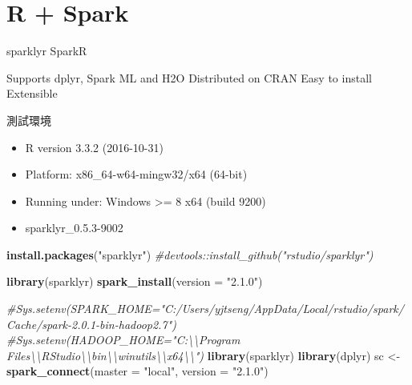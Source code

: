 \documentclass[]{book}
\newenvironment{Shaded}{\begin{snugshade}}{\end{snugshade}}
\newcommand{\KeywordTok}[1]{\textcolor[rgb]{0.13,0.29,0.53}{\textbf{{#1}}}}
\newcommand{\DataTypeTok}[1]{\textcolor[rgb]{0.13,0.29,0.53}{{#1}}}
\newcommand{\StringTok}[1]{\textcolor[rgb]{0.31,0.60,0.02}{{#1}}}
\newcommand{\CommentTok}[1]{\textcolor[rgb]{0.56,0.35,0.01}{\textit{{#1}}}}
\newcommand{\NormalTok}[1]{{#1}}
\providecommand{\tightlist}{%
  \setlength{\itemsep}{0pt}\setlength{\parskip}{0pt}}
\theoremstyle{definition}
\theoremstyle{definition}
\theoremstyle{remark}
\begin{document}
\section{R + Spark}\label{r-spark}

sparklyr SparkR

Supports dplyr, Spark ML and H2O Distributed on CRAN Easy to install
Extensible

測試環境

\begin{itemize}
\tightlist
\item
  R version 3.3.2 (2016-10-31)
\item
  Platform: x86\_64-w64-mingw32/x64 (64-bit)
\item
  Running under: Windows \textgreater{}= 8 x64 (build 9200)
\item
  sparklyr\_0.5.3-9002
\end{itemize}

\begin{Shaded}
\begin{Highlighting}[]
\KeywordTok{install.packages}\NormalTok{(}\StringTok{"sparklyr"}\NormalTok{)}
\CommentTok{#devtools::install_github("rstudio/sparklyr")}
\end{Highlighting}
\end{Shaded}

\begin{Shaded}
\begin{Highlighting}[]
\KeywordTok{library}\NormalTok{(sparklyr)}
\KeywordTok{spark_install}\NormalTok{(}\DataTypeTok{version =} \StringTok{"2.1.0"}\NormalTok{)}
\end{Highlighting}
\end{Shaded}

\begin{Shaded}
\begin{Highlighting}[]
\CommentTok{#Sys.setenv(SPARK_HOME="C:/Users/yjtseng/AppData/Local/rstudio/spark/Cache/spark-2.0.1-bin-hadoop2.7")}
\CommentTok{#Sys.setenv(HADOOP_HOME="C:\textbackslash{}\textbackslash{}Program Files\textbackslash{}\textbackslash{}RStudio\textbackslash{}\textbackslash{}bin\textbackslash{}\textbackslash{}winutils\textbackslash{}\textbackslash{}x64\textbackslash{}\textbackslash{}")}
\KeywordTok{library}\NormalTok{(sparklyr)}
\KeywordTok{library}\NormalTok{(dplyr)}
\NormalTok{sc <-}\StringTok{ }\KeywordTok{spark_connect}\NormalTok{(}\DataTypeTok{master =} \StringTok{"local"}\NormalTok{, }\DataTypeTok{version =} \StringTok{"2.1.0"}\NormalTok{)}
\end{Highlighting}
\end{Shaded}
\end{document}
